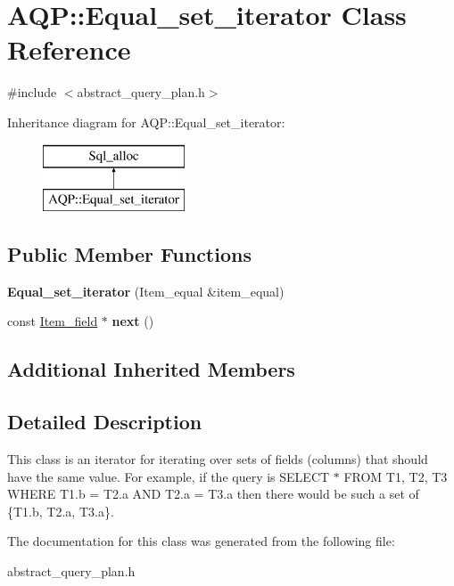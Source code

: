 \hypertarget{classAQP_1_1Equal__set__iterator}{}\section{A\+QP\+:\+:Equal\+\_\+set\+\_\+iterator Class Reference}
\label{classAQP_1_1Equal__set__iterator}


{\ttfamily \#include $<$abstract\+\_\+query\+\_\+plan.\+h$>$}

Inheritance diagram for A\+QP\+:\+:Equal\+\_\+set\+\_\+iterator\+:\begin{figure}[H]
\begin{center}
\leavevmode
\includegraphics[height=2.000000cm]{classAQP_1_1Equal__set__iterator}
\end{center}
\end{figure}
\subsection*{Public Member Functions}
\begin{DoxyCompactItemize}
\item 
\mbox{\label{classAQP_1_1Equal__set__iterator_a10128ea7870c330cd7734d90275f8622}} 
{\bfseries Equal\+\_\+set\+\_\+iterator} (Item\+\_\+equal \&item\+\_\+equal)
\item 
\mbox{\label{classAQP_1_1Equal__set__iterator_a3c6957d1bdb0bf18a7e6bb2c56d00828}} 
const \mbox{\hyperlink{classItem__field}{Item\+\_\+field}} $\ast$ {\bfseries next} ()
\end{DoxyCompactItemize}
\subsection*{Additional Inherited Members}


\subsection{Detailed Description}
This class is an iterator for iterating over sets of fields (columns) that should have the same value. For example, if the query is S\+E\+L\+E\+CT $\ast$ F\+R\+OM T1, T2, T3 W\+H\+E\+RE T1.\+b = T2.\+a A\+ND T2.\+a = T3.\+a then there would be such a set of \{T1.\+b, T2.\+a, T3.\+a\}. 

The documentation for this class was generated from the following file\+:\begin{DoxyCompactItemize}
\item 
abstract\+\_\+query\+\_\+plan.\+h\end{DoxyCompactItemize}
